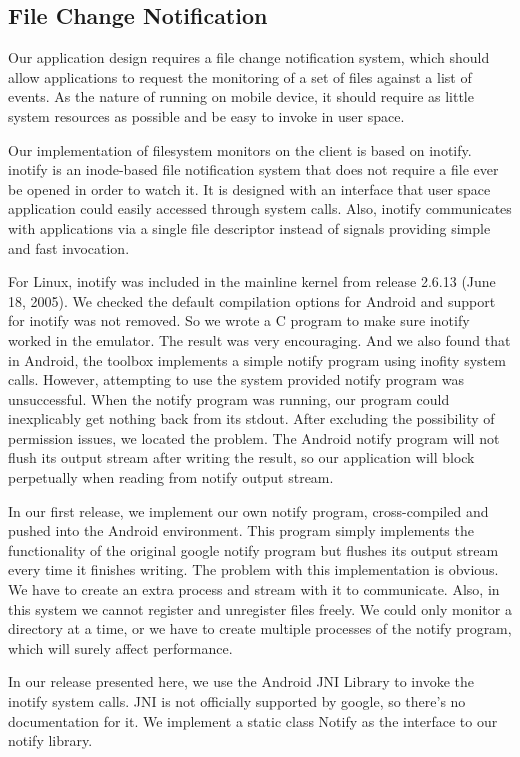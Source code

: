 \subsection{File Change Notification}
Our application design requires a file change notification system, which should allow applications to request 
the monitoring of a set of files against a list of events. As the nature of running on mobile device, it should 
require as little system resources as possible and be easy to invoke in user space. 

Our implementation of filesystem monitors on the client is based on inotify. inotify is an inode-based file notification system 
that does not require a file ever be opened in order to watch it. It is designed with an interface that user space 
application could easily accessed through system calls. Also, inotify communicates with applications via a single 
file descriptor instead of signals providing simple and fast invocation.

For Linux, inotify was included in the mainline kernel from release 2.6.13 (June 18, 2005)\cite{Love:2005p1294}. We 
checked the default compilation options for Android and support for inotify was not removed. So we wrote a 
C program to make sure inotify worked in the emulator. The result was very encouraging. And we also found that in Android, 
the toolbox implements a simple notify program using inofity system calls. However, attempting to use the 
system provided notify program was unsuccessful. When the notify program was running, our program could inexplicably get nothing back from 
its stdout. After excluding the possibility of permission issues, we located the problem. The Android notify program will 
not flush its output stream after writing the result, so our application will block perpetually when reading from notify output stream. 

In our first release, we implement our own notify program, cross-compiled and pushed into the Android environment. This 
program simply implements the functionality of the original google notify program but flushes its output 
stream every time it finishes writing. The problem with this implementation is obvious. We have to create an extra process 
and stream with it to communicate. Also, in this system we cannot register and unregister files freely. 
We could only monitor a directory at a time, or we have to create multiple processes of the notify program, which will 
surely affect performance. 

In our release presented here, we use the Android JNI Library to invoke the inotify system calls. JNI is not officially 
supported by google\cite{Google:2008}, so there's no documentation for it. We implement a static class Notify as the interface to our 
notify library. 

